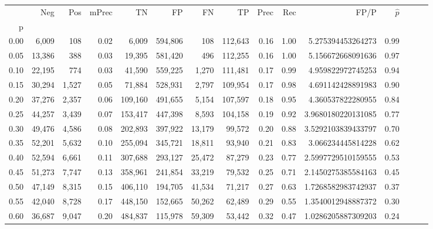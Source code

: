 \begin{tabular}{rrrrrrrrrrrrrrr}
\toprule
{} &     Neg &    Pos & mPrec &       TN &       FP &       FN &       TP &  Prec &   Rec &                  FP/P & $\hat{p}$ \\
p    &         &        &       &          &          &          &          &       &       &                       &           \\
\midrule
0.00 &   6,009 &    108 &  0.02 &    6,009 &  594,806 &      108 &  112,643 &  0.16 &  1.00 &     5.275394453264273 &      0.99 \\
0.05 &  13,386 &    388 &  0.03 &   19,395 &  581,420 &      496 &  112,255 &  0.16 &  1.00 &     5.156672668091636 &      0.97 \\
0.10 &  22,195 &    774 &  0.03 &   41,590 &  559,225 &    1,270 &  111,481 &  0.17 &  0.99 &     4.959822972745253 &      0.94 \\
0.15 &  30,294 &  1,527 &  0.05 &   71,884 &  528,931 &    2,797 &  109,954 &  0.17 &  0.98 &     4.691142428891983 &      0.90 \\
0.20 &  37,276 &  2,357 &  0.06 &  109,160 &  491,655 &    5,154 &  107,597 &  0.18 &  0.95 &     4.360537822280955 &      0.84 \\
0.25 &  44,257 &  3,439 &  0.07 &  153,417 &  447,398 &    8,593 &  104,158 &  0.19 &  0.92 &    3.9680180220131085 &      0.77 \\
0.30 &  49,476 &  4,586 &  0.08 &  202,893 &  397,922 &   13,179 &   99,572 &  0.20 &  0.88 &    3.5292103839433797 &      0.70 \\
0.35 &  52,201 &  5,632 &  0.10 &  255,094 &  345,721 &   18,811 &   93,940 &  0.21 &  0.83 &     3.066234445814228 &      0.62 \\
0.40 &  52,594 &  6,661 &  0.11 &  307,688 &  293,127 &   25,472 &   87,279 &  0.23 &  0.77 &    2.5997729510159555 &      0.53 \\
0.45 &  51,273 &  7,747 &  0.13 &  358,961 &  241,854 &   33,219 &   79,532 &  0.25 &  0.71 &    2.1450275385584163 &      0.45 \\
0.50 &  47,149 &  8,315 &  0.15 &  406,110 &  194,705 &   41,534 &   71,217 &  0.27 &  0.63 &    1.7268582983742937 &      0.37 \\
0.55 &  42,040 &  8,728 &  0.17 &  448,150 &  152,665 &   50,262 &   62,489 &  0.29 &  0.55 &    1.3540012948887372 &      0.30 \\
0.60 &  36,687 &  9,047 &  0.20 &  484,837 &  115,978 &   59,309 &   53,442 &  0.32 &  0.47 &    1.0286205887309203 &      0.24 \\

\end{tabular}
